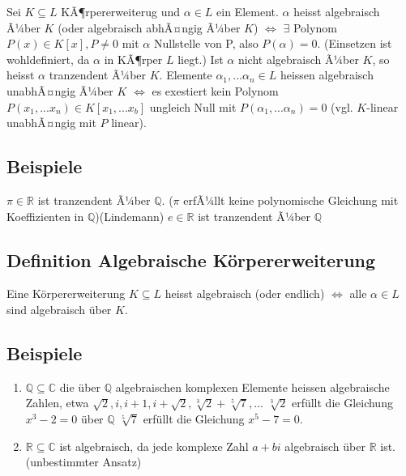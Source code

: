 \documentclass[12pt,a4paper,ngerman]{scrreprt}
\begin{document}
Sei $K \subseteq L $ KÃ¶rpererweiterug und $\alpha \in L$ ein Element.
$\alpha$ heisst algebraisch Ã¼ber $K$ (oder algebraisch abhÃ¤ngig Ã¼ber $K$)
$\Leftrightarrow$ $\exists$ Polynom $P(x) \in K[x], P \neq 0$ mit $\alpha$ Nullstelle von P,
also $P(\alpha) = 0$. (Einsetzen ist wohldefiniert, da $\alpha$ in KÃ¶rper $L$ liegt.)
Ist $\alpha$ nicht algebraisch Ã¼ber $K$, so heisst $\alpha$ tranzendent Ã¼ber $K$.
Elemente $\alpha_1, ... \alpha_n \in L$ heissen algebraisch unabhÃ¤ngig Ã¼ber $K$ 
$\Leftrightarrow$ es exestiert kein Polynom $P(x_1, ... x_n) \in K[x_1, ... x_b]$
ungleich Null mit $P(\alpha_1, ... \alpha_n) = 0$ (vgl. $K$-linear unabhÃ¤ngig mit $P$ linear).

\subsection{Beispiele}
$\pi \in \mathbb{R}$ ist tranzendent Ã¼ber $\mathbb{Q}$.
($\pi$ erfÃ¼llt keine polynomische Gleichung mit Koeffizienten in $\mathbb{Q}$)(Lindemann)
$e \in \mathbb{R}$ ist tranzendent Ã¼ber $\mathbb{Q}$

\subsection{Definition Algebraische Körpererweiterung}
Eine Körpererweiterung $K \subseteq L$ heisst algebraisch (oder endlich)
$\Leftrightarrow$ alle $\alpha \in L$ sind algebraisch über $K$.

\subsection{Beispiele}
\begin{enumerate}[(1)]
\item $\mathbb{Q} \subseteq \mathbb{C}$ die über $\mathbb{Q}$ algebraischen komplexen Elemente heissen algebraische Zahlen,
etwa $\sqrt{2}, i, i+1, i+\sqrt{2}, \sqrt[3]{2} + \sqrt[5]{7}, ...$ $\sqrt[3]{2}$ erfüllt die Gleichung $x^3 -2 = 0$ über $\mathbb{Q}$
$\sqrt[5]{7}$ erfüllt die Gleichung $x^5 -7 = 0$.
\item $\mathbb{R} \subseteq \mathbb{C}$ ist algebraisch, da jede komplexe Zahl $a+bi$ algebraisch über $\mathbb{R}$ ist. (unbestimmter Ansatz)
\end{enumerate}
\end{document}
